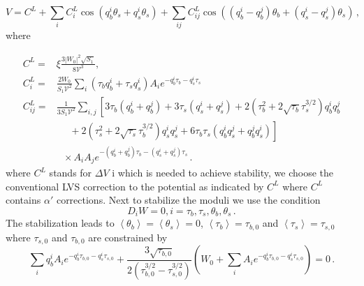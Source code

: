 \documentclass[12pt]{article}
\begin{document}
\begin{equation}
    V =  C^L +  \sum_{i} C^L_i  \cos\left(q_b^i \theta_s + q^i_s \theta_s\right)
    +\sum_{ij} C^L_{ij}  
              \cos\left(
              \left(q_b^i - q_b^j\right) \theta_b
            + \left(q_s^i - q_s^j\right) \theta_s
          \right)\,,
\end{equation}
where 

 \begin{equation} 
\begin{aligned}
C^L=& \xi \frac{3 \left|W_0\right|^2 \sqrt{S_1}}{8 \mathcal{V}^3},\\ 
  C^L_i= &\frac{2 W_0}{S_1 \mathcal{V}^2} \sum_i \left(\tau_b q_b^i + \tau_s q_s^i\right)
          A_i e^{-q_b^i \tau_b - q_s^i \tau_s}\\
  C^L_{ij}= & \frac{1}{3 S_1 \mathcal{V}^2} \sum_{i, j} \left[
              3 \tau_b \left(q^i_b + q^j_b\right)
            + 3 \tau_s \left(q_s^i + q_s^j\right)
            + 2 \left(\tau_b^2 + 2 \sqrt{\tau_b} \tau_s^{3 / 2}\right) q_b^i q_b^j\right.\\
            &~~~~~~ \left.{}
            + 2 \left(\tau^2_s + 2 \sqrt{\tau_s} \tau^{3 / 2}_b\right) q_s^i q_s^j
            + 6 \tau_b \tau_s \left(q_b^i q_s^j + q_b^j q_s^i\right)
        \right]\\
        &~~~ \times A_i A_j
          e^{-\left(q_b^i + q_b^j\right) \tau_b - \left(q_s^i + q_s^j\right) \tau_s}\,.
  \end{aligned}
\end{equation}
 where $C^L$ stands for  $\Delta V$ i 
 which is needed to achieve stability, we choose the conventional LVS correction to the potential as indicated by $C^L$
where $C^L$ contains $\alpha'$ corrections.
Next to stabilize the moduli we use the condition
\begin{equation}
  D_i W = 0, i = \tau_b, \tau_s, \theta_b, \theta_s\,.
\end{equation}
The stabilization leads to $\left<\theta_b\right> = \left<\theta_s\right> = 0$, $\left<\tau_b\right> = \tau_{b, 0}$ and $\left<\tau_s\right> = \tau_{s, 0}$ where $\tau_{s, 0}$ and $\tau_{b, 0}$ are constrained by
\begin{equation} \label{eq:LVS:stabilization}
  \sum_i q^i_b A_i e^{-q_b^i \tau_{b, 0} - q^i_s \tau_{s, 0}}
  + \frac{3 \sqrt{\tau_{b, 0}}}{2 \left(\tau^{3 / 2}_{b, 0} - \tau^{3 / 2}_{s, 0}\right)} \left(
    W_0 + \sum_i A_i e^{-q^i_b \tau_{b, 0} - q_s^i \tau_{s, 0}}
  \right) = 0\,.
\end{equation}
\end{document}
